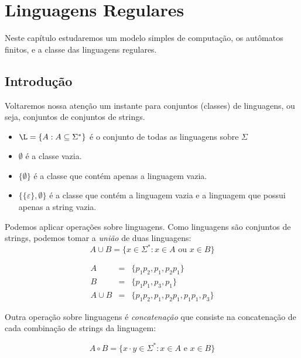 \chapter{Linguagens Regulares}
\label{cha:automatos}

Neste capítulo estudaremos um modelo simples de computação, os autômatos finitos, e a classe das linguagens regulares.

\section{Introdução}
\label{sec:linguagens-regulares}

Voltaremos nossa atenção um instante para conjuntos (classes) de linguagens, ou seja, conjuntos de conjuntos de strings.

\begin{example}
\begin{itemize}
\item[] $\L = \{A: A \subseteq \Sigma^*\}$ é o conjunto de todas as linguagens sobre $\Sigma$
\item[] $\emptyset$ é a classe vazia.
\item[] $\{\emptyset\}$ é a classe que contém apenas a linguagem vazia.
\item[] $\{\{\varepsilon\}, \emptyset\}$ é a classe que contém a linguagem vazia e a linguagem que possui apenas a string vazia.
\end{itemize}
\end{example}

Podemos aplicar operações sobre linguagens.
Como linguagens são conjuntos de strings, podemos tomar a {\em união} de duas linguagens:
\begin{displaymath}
  A \cup B = \{x \in \Sigma^* : x \in A \textrm{ ou } x \in B\}
\end{displaymath}


\begin{example}
  \begin{eqnarray*}
    A & = & \{p_1p_2, p_1, p_2p_1\}\\
    B & = & \{p_1p_1, p_3, p_1\}\\
    A \cup B & = & \{p_1p_2, p_1, p_2p_1, p_1p_1, p_3\}
  \end{eqnarray*}
\end{example}

Outra operação sobre linguagens é {\em concatenação} que consiste na concatenação de cada combinação de strings da linguagem:

\begin{displaymath}
  A \circ B = \{x \cdot y \in \Sigma^* : x \in A \textrm{ e } x \in B\}
\end{displaymath}

